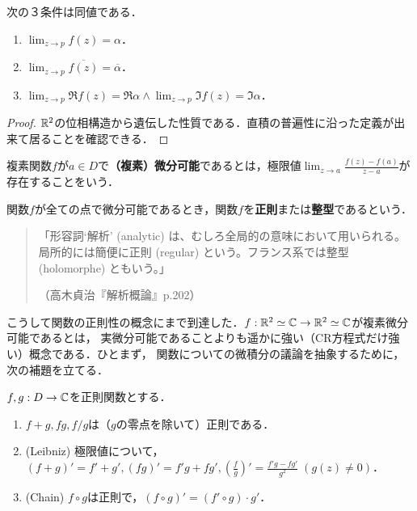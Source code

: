 \documentclass[uplatex, dvipdfmx]{jsreport}
\begin{document}
\begin{proposition}
    次の３条件は同値である．
    \begin{enumerate}
        \item $\lim_{z\to p}f(z)=\alpha$．
        \item $\lim_{z\to p}\overline{f(z)}=\overline{\alpha}$．
        \item $\lim_{z\to p}\Re f(z)=\Re\alpha\land\lim_{z\to p}\Im f(z)=\Im\alpha$．
    \end{enumerate}
\end{proposition}
\begin{proof}
    $\mathbb{R}^2$の位相構造から遺伝した性質である．直積の普遍性に沿った定義が出来て居ることを確認できる．
\end{proof}

\begin{definition}\mbox{}

    複素関数$f$が$a\in D$で\textbf{（複素）微分可能}であるとは，極限値$\lim_{z\to a}\frac{f(z)-f(a)}{z-a}$が存在することをいう．

    関数$f$が全ての点で微分可能であるとき，関数$f$を\textbf{正則}または\textbf{整型}であるという．
    \begin{quotation}
        「形容詞‘解析’ (analytic) は、むしろ全局的の意味において用いられる。局所的には簡便に正則 (regular) という。フランス系では整型 (holomorphe) ともいう。」
        \begin{flushright}
            （高木貞治『解析概論』p.202）
        \end{flushright}
    \end{quotation}
\end{definition}

こうして関数の正則性の概念にまで到達した．$f:\mathbb{R}^2\simeq\mathbb{C}\to\mathbb{R}^2\simeq\mathbb{C}$が複素微分可能であるとは，
実微分可能であることよりも遥かに強い（CR方程式だけ強い）概念である．ひとまず，
関数についての微積分の議論を抽象するために，次の補題を立てる．

\begin{lemma}[関数の正則性の遺伝と微分法則]\label{lemma-derivatives-of-complex-functions}
    $f,g:D\to\mathbb{C}$を正則関数とする．
    \begin{enumerate}
        \item $f+g,fg,f/g$は（$g$の零点を除いて）正則である．
        \item (Leibniz) 極限値について，$(f+g)'=f'+g', (fg)'=f'g+fg', \left(\frac{f}{g}\right)'=\frac{f'g-fg'}{g^2}\;(g(z)\ne 0)$．
        \item (Chain) $f\circ g$は正則で，$(f\circ g)'=(f'\circ g)\cdot g'$．
    \end{enumerate}
\end{lemma}
\end{document}
